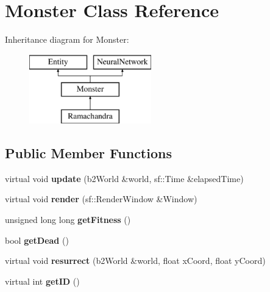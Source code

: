 \hypertarget{class_monster}{\section{Monster Class Reference}
\label{class_monster}
}
Inheritance diagram for Monster\-:\begin{figure}[H]
\begin{center}
\leavevmode
\includegraphics[height=3.000000cm]{class_monster}
\end{center}
\end{figure}
\subsection*{Public Member Functions}
\begin{DoxyCompactItemize}
\item 
\hypertarget{class_monster_aeff591902eae79493bd713883f1356c5}{virtual void {\bfseries update} (b2\-World \&world, sf\-::\-Time \&elapsed\-Time)}\label{class_monster_aeff591902eae79493bd713883f1356c5}

\item 
\hypertarget{class_monster_a4d194dc47ad8d4a87cc2f58df7fdc624}{virtual void {\bfseries render} (sf\-::\-Render\-Window \&Window)}\label{class_monster_a4d194dc47ad8d4a87cc2f58df7fdc624}

\item 
\hypertarget{class_monster_ac93ae314a09c74e90206adbd59b5547d}{unsigned long long {\bfseries get\-Fitness} ()}\label{class_monster_ac93ae314a09c74e90206adbd59b5547d}

\item 
\hypertarget{class_monster_ae915f10d3a2cfd6172b8f5d96a209bdd}{bool {\bfseries get\-Dead} ()}\label{class_monster_ae915f10d3a2cfd6172b8f5d96a209bdd}

\item 
\hypertarget{class_monster_af1ded6e0a1365439cc7261072bfc42e6}{virtual void {\bfseries resurrect} (b2\-World \&world, float x\-Coord, float y\-Coord)}\label{class_monster_af1ded6e0a1365439cc7261072bfc42e6}

\item 
\hypertarget{class_monster_a96b2fd8a63a477aeb39ea5e97c1b9535}{virtual int {\bfseries get\-I\-D} ()}\label{class_monster_a96b2fd8a63a477aeb39ea5e97c1b9535}

\end{DoxyCompactItemize}
